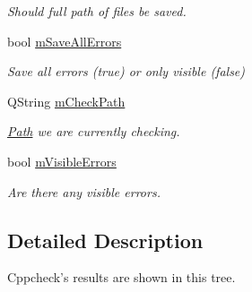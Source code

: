 \begin{DoxyCompactItemize}
\begin{DoxyCompactList}\small\item\em Should full path of files be saved. \end{DoxyCompactList}\item 
bool \hyperlink{class_results_tree_abdcc47d8713e599e1a9a48fcab53a0ce}{m\-Save\-All\-Errors}
\begin{DoxyCompactList}\small\item\em Save all errors (true) or only visible (false) \end{DoxyCompactList}\item 
Q\-String \hyperlink{class_results_tree_a92586c85ef2b0c8ce3bc6fc8023cdfdc}{m\-Check\-Path}
\begin{DoxyCompactList}\small\item\em \hyperlink{class_path}{Path} we are currently checking. \end{DoxyCompactList}\item 
bool \hyperlink{class_results_tree_a60ddd8ebf2e1ee75765a4de8bbcf3f05}{m\-Visible\-Errors}
\begin{DoxyCompactList}\small\item\em Are there any visible errors. \end{DoxyCompactList}\end{DoxyCompactItemize}


\subsection{Detailed Description}
Cppcheck's results are shown in this tree. 

